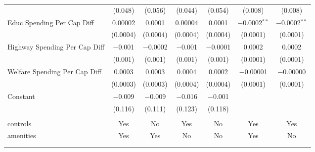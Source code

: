 \begin{table}[!htbp]
\begin{tabular}{@{\extracolsep{5pt}}lcccccc}
  & (0.048) & (0.056) & (0.044) & (0.054) & (0.008) & (0.008) \\ 
  Educ Spending Per Cap Diff & 0.00002 & 0.0001 & 0.00004 & 0.0001 & $-$0.0002$^{**}$ & $-$0.0002$^{**}$ \\ 
  & (0.0004) & (0.0004) & (0.0004) & (0.0004) & (0.0001) & (0.0001) \\ 
  Highway Spending Per Cap Diff & $-$0.001 & $-$0.0002 & $-$0.001 & $-$0.0001 & 0.0002 & 0.0002 \\ 
  & (0.001) & (0.001) & (0.001) & (0.001) & (0.0001) & (0.0001) \\ 
  Welfare Spending Per Cap Diff & 0.0003 & 0.0003 & 0.0004 & 0.0002 & $-$0.00001 & $-$0.00000 \\ 
  & (0.0003) & (0.0003) & (0.0004) & (0.0004) & (0.0001) & (0.0001) \\ 
  Constant & $-$0.009 & $-$0.009 & $-$0.016 & $-$0.001 &  &  \\ 
  & (0.116) & (0.111) & (0.123) & (0.118) &  &  \\ 
 \hline \\[-1.8ex] 
controls & Yes & No & Yes & No & Yes & Yes \\ 
amenities & Yes & Yes & No & No & Yes & No \\ 
\hline \\[-1.8ex] 
\hline 
\hline \\[-1.8ex] 
\end{tabular} 
\end{table} 
